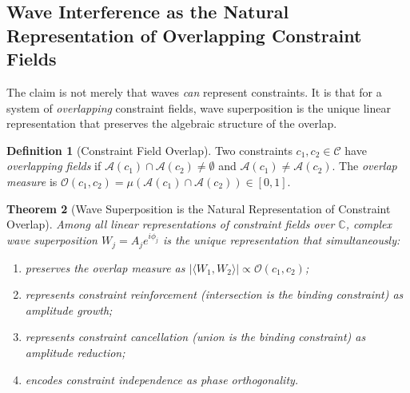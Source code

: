 \documentclass[12pt, a4paper, twoside]{article}
\theoremstyle{plain}
\newtheorem{theorem}{Theorem}[section]
\theoremstyle{definition}
\newtheorem{definition}[theorem]{Definition}
\theoremstyle{remark}
\newcommand{\Acc}{\mathcal{A}}
\begin{document}
\subsection{Wave Interference as the Natural Representation of Overlapping Constraint Fields}

The claim is not merely that waves \emph{can} represent constraints. It is
that for a system of \emph{overlapping} constraint fields, wave superposition
is the unique linear representation that preserves the algebraic structure of
the overlap.

\begin{definition}[Constraint Field Overlap]
\label{def:field_overlap}
Two constraints $c_1, c_2 \in \mathcal{C}$ have \emph{overlapping fields} if
$\Acc(c_1) \cap \Acc(c_2) \neq \emptyset$ and $\Acc(c_1) \neq \Acc(c_2)$.
The \emph{overlap measure} is
$\mathcal{O}(c_1, c_2) = \mu(\Acc(c_1) \cap \Acc(c_2)) \in [0,1]$.
\end{definition}

\begin{theorem}[Wave Superposition is the Natural Representation of Constraint Overlap]
\label{thm:wave_natural}
Among all linear representations of constraint fields over $\mathbb{C}$,
complex wave superposition $W_j = A_j e^{i\phi_j}$ is the unique
representation that simultaneously:
\begin{enumerate}[label=(\roman*)]
  \item preserves the overlap measure as $|\langle W_1, W_2 \rangle| \propto
    \mathcal{O}(c_1, c_2)$;
  \item represents constraint reinforcement (intersection is the binding
    constraint) as amplitude growth;
  \item represents constraint cancellation (union is the binding constraint)
    as amplitude reduction;
  \item encodes constraint independence as phase orthogonality.
\end{enumerate}
\end{theorem}
\end{document}

